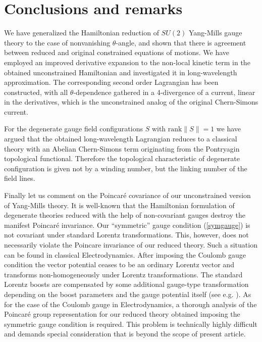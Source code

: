 \documentclass[a4paper,12pt]{article}
\begin{document}

\section{Conclusions and remarks}


We have generalized the Hamiltonian reduction of
$SU(2)$ Yang-Mills gauge theory to the case of nonvanishing $\theta$-angle,
and shown that there is agreement between reduced
and original constrained equations of motions.
We have employed an improved derivative expansion to the non-local
kinetic term in the obtained unconstrained Hamiltonian and
investigated it in long-wavelength approximation.
The corresponding second order Lagrangian has been constructed,
with all $\theta$-dependence gathered in a 4-divergence of
a current, linear in the derivatives, which is the
unconstrained analog of the original Chern-Simons current.

For the degenerate gauge field configurations $S$ with $\mbox{rank}\|S\| =1$
we have argued that the obtained long-wavelength Lagrangian reduces to a
classical theory with an Abelian Chern-Simons term originating from the
Pontryagin topological functional.
Therefore the topological characteristic of degenerate
configuration is given not by a winding number,
but the linking number of the field lines.

Finally let us comment on the Poincar\'{e} covariance of our
unconstrained version of Yang-Mills theory. It is well-known that the
Hamiltonian formulation of degenerate theories reduced with the help of
non-covariant gauges destroy the manifest Poincar\'{e} invariance.
Our ``symmetric'' gauge condition (\ref{symgauge})
is not covariant under standard Lorentz transformations.
This, however, does not necessarily violate
the Poincare invariance of our reduced theory.
Such a situation can be found in classical Electrodynamics.
After imposing the Coulomb gauge condition the vector potential
ceases to be an ordinary Lorentz vector and
transforms non-homogeneously under Lorentz transformations.
The standard Lorentz boosts are compensated by some additional
gauge-type transformation depending on the
boost parameters and the gauge potential itself
(see e.g. \cite{BjorkenDrell,HansonReggeTeitelboim,PavelPervushin}).
As for the case of the Coulomb gauge in
Electrodynamics, a thorough analysis of the Poincar\'{e} group representation
for our reduced theory obtained imposing the symmetric gauge condition
is required. This problem is technically highly difficult and demands
special consideration that is beyond the scope of present article.
\end{document}
